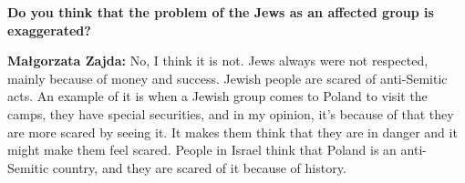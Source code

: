 \textbf{Do you think that the problem of the Jews as an affected group is exaggerated?}

\textbf{Małgorzata Zajda:} No, I think it is not. Jews always were not respected, mainly because of money and success. 
Jewish people are scared of anti-Semitic acts. An example of it is when a Jewish group comes to Poland to visit the camps, they have special securities, and in my opinion, it’s because of that they are more scared by seeing it. It makes them think that they are in danger and it might make them feel scared. People in Israel think that Poland is an anti-Semitic country, and they are scared of it because of history.  

 

 